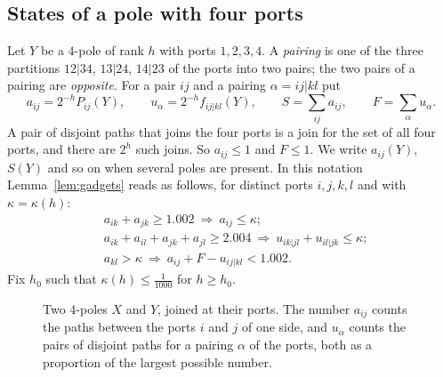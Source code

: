 \subsection{States of a pole with four ports}

Let $Y$ be a $4$-pole of rank $h$ with ports $1,2,3,4$. A \emph{pairing} is one of the three
partitions $12|34$, $13|24$, $14|23$ of the ports into two pairs; the two pairs of a pairing are
\emph{opposite}. For a pair $ij$ and a pairing $\alpha=ij|kl$ put
\[
  a_{ij}=2^{-h}P_{ij}(Y),\qquad u_\alpha=2^{-h}f_{ij|kl}(Y),\qquad
  S=\sum_{ij}a_{ij},\qquad F=\sum_\alpha u_\alpha .
\]
A pair of disjoint paths that joins the four ports is a join for the set of all four ports, and
there are $2^{h}$ such joins. So $a_{ij}\le1$ and $F\le1$. We write $a_{ij}(Y)$, $S(Y)$ and so on
when several poles are present. In this notation Lemma~\ref{lem:gadgets} reads as follows, for
distinct ports $i,j,k,l$ and with $\kappa=\kappa(h)$:
\begin{align}
  &a_{ik}+a_{jk}\ge1.002\ \Longrightarrow\ a_{ij}\le\kappa;\label{eq:T1}\\
  &a_{ik}+a_{il}+a_{jk}+a_{jl}\ge2.004\ \Longrightarrow\ u_{ik|jl}+u_{il|jk}\le\kappa;\label{eq:T2}\\
  &a_{kl}>\kappa\ \Longrightarrow\ a_{ij}+F-u_{ij|kl}<1.002.\label{eq:T3}
\end{align}
Fix $h_0$ such that $\kappa(h)\le\frac1{1000}$ for $h\ge h_0$.

\begin{figure}[ht]
\centering
{}
\caption{Two $4$-poles $X$ and $Y$, joined at their ports. The number $a_{ij}$ counts the paths
between the ports $i$ and $j$ of one side, and $u_\alpha$ counts the pairs of disjoint paths for
a pairing $\alpha$ of the ports, both as a proportion of the largest possible number.}
\label{fig:glue}
\end{figure}

